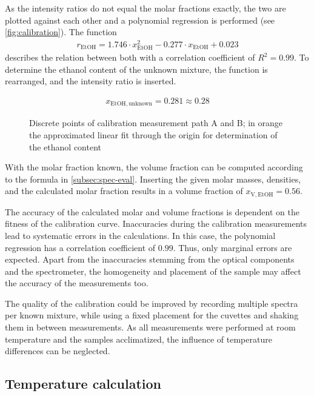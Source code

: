 As the intensity ratios do not equal the molar fractions exactly, the two are plotted against each other and a polynomial regression is performed (see \autoref{fig:calibration}). The function
\begin{align}
    r_\mathrm{EtOH}=1.746 \cdot x_\mathrm{EtOH}^2 - 0.277 \cdot x_\mathrm{EtOH} + 0.023 \nonumber
\end{align}
describes the relation between both with a correlation coefficient of $R^2=0.99$. To determine the ethanol content of the unknown mixture, the function is rearranged, and the intensity ratio is inserted.

\begin{align}
    x_\mathrm{EtOH,unknown}=0.281\approx0.28 \nonumber
\end{align}

\begin{figure}[!htb]
    \centering
    
    \caption[Plot of calibration measurement with linear fit]{Discrete points of calibration measurement path A and B; in orange the approximated linear fit through the origin for determination of the ethanol content}
    \label{fig:calibration}
\end{figure}

With the molar fraction known, the volume fraction can be computed according to the formula in \autoref{subsec:spec-eval}. Inserting the given molar masses, densities, and the calculated molar fraction results in a volume fraction of $x_\mathrm{V,EtOH}=0.56$.

The accuracy of the calculated molar and volume fractions is dependent on the fitness of the calibration curve. Inaccuracies during the calibration measurements lead to systematic errors in the calculations. In this case, the polynomial regression has a correlation coefficient of $0.99$. Thus, only marginal errors are expected. Apart from the inaccuracies stemming from the optical components and the spectrometer, the homogeneity and placement of the sample may affect the accuracy of the measurements too.

The quality of the calibration could be improved by recording multiple spectra per known mixture, while using a fixed placement for the cuvettes and shaking them in between measurements. As all measurements were performed at room temperature and the samples acclimatized, the influence of temperature differences can be neglected.

\subsection{Temperature calculation}
\label{subsec:temp-eval}

